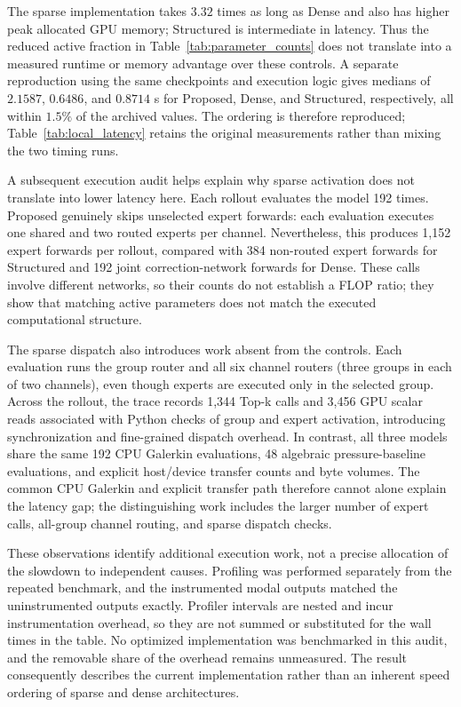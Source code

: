The sparse implementation takes $3.32$ times as long as Dense and also
has higher peak allocated GPU memory; Structured is intermediate in
latency. Thus the reduced active fraction in
Table~\ref{tab:parameter_counts} does not translate into a measured
runtime or memory advantage over these controls. A separate reproduction
using the same checkpoints and execution logic gives medians of
$2.1587$, $0.6486$, and $0.8714$ s for Proposed, Dense, and Structured,
respectively, all within $1.5\%$ of the archived values. The ordering
is therefore reproduced; Table~\ref{tab:local_latency} retains the
original measurements rather than mixing the two timing runs.

A subsequent execution audit helps explain why sparse activation does
not translate into lower latency here. Each rollout evaluates the model
192 times. Proposed genuinely skips unselected expert forwards: each
evaluation executes one shared and two routed experts per channel.
Nevertheless, this produces 1,152 expert forwards per rollout, compared
with 384 non-routed expert forwards for Structured and 192 joint
correction-network forwards for Dense. These calls involve different
networks, so their counts do not establish a FLOP ratio; they show that
matching active parameters does not match the executed computational
structure.

The sparse dispatch also introduces work absent from the controls.
Each evaluation runs the group router and all six channel routers
(three groups in each of two channels), even though experts are executed
only in the selected group. Across the rollout, the trace records
1,344 Top-k calls and 3,456 GPU scalar reads associated with Python
checks of group and expert activation, introducing synchronization and
fine-grained dispatch overhead. In contrast, all three models share
the same 192 CPU Galerkin evaluations, 48 algebraic pressure-baseline
evaluations, and explicit host/device transfer counts and byte volumes.
The common CPU Galerkin and explicit transfer path therefore cannot
alone explain the latency gap; the distinguishing work includes the
larger number of expert calls, all-group channel routing, and sparse
dispatch checks.

These observations identify additional execution work, not a precise
allocation of the slowdown to independent causes. Profiling was
performed separately from the repeated benchmark, and the instrumented
modal outputs matched the uninstrumented outputs exactly. Profiler
intervals are nested and incur instrumentation overhead, so they are
not summed or substituted for the wall times in the table. No optimized
implementation was benchmarked in this audit, and the removable share
of the overhead remains unmeasured. The result consequently describes
the current implementation rather than an inherent speed ordering of
sparse and dense architectures.

